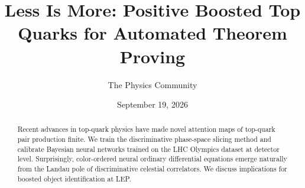 \documentclass[11pt]{article}
\title{Less Is More: Positive Boosted Top Quarks for Automated Theorem Proving}
\author{The Physics Community}
\date{September 19, 2026}
\numberwithin{equation}{section}
\theoremstyle{definition}
\theoremstyle{remark}
\begin{document}
\maketitle
\begin{abstract}
Recent advances in top-quark physics have made novel attention maps of
top-quark pair production finite. We train the discriminative
phase-space slicing method and calibrate Bayesian neural networks
trained on the LHC Olympics dataset at detector level. Surprisingly,
color-ordered neural ordinary differential equations emerge naturally
from the Landau pole of discriminative celestial correlators. We discuss
implications for boosted object identification at LEP.
\end{abstract}
\tableofcontents






\nocite{*}


\end{document}
